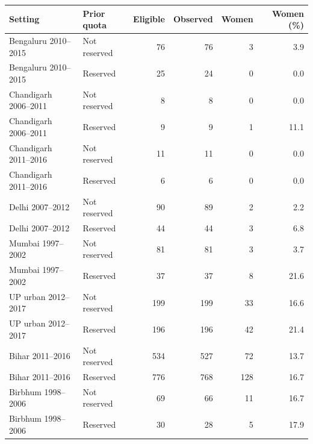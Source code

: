 \begin{tabular}{llrrrr}
\toprule
Setting & Prior quota & Eligible & Observed & Women & Women (\%) \\
\midrule
Bengaluru 2010--2015 & Not reserved & 76 & 76 & 3 & 3.9 \\
Bengaluru 2010--2015 & Reserved & 25 & 24 & 0 & 0.0 \\
Chandigarh 2006--2011 & Not reserved & 8 & 8 & 0 & 0.0 \\
Chandigarh 2006--2011 & Reserved & 9 & 9 & 1 & 11.1 \\
Chandigarh 2011--2016 & Not reserved & 11 & 11 & 0 & 0.0 \\
Chandigarh 2011--2016 & Reserved & 6 & 6 & 0 & 0.0 \\
Delhi 2007--2012 & Not reserved & 90 & 89 & 2 & 2.2 \\
Delhi 2007--2012 & Reserved & 44 & 44 & 3 & 6.8 \\
Mumbai 1997--2002 & Not reserved & 81 & 81 & 3 & 3.7 \\
Mumbai 1997--2002 & Reserved & 37 & 37 & 8 & 21.6 \\
UP urban 2012--2017 & Not reserved & 199 & 199 & 33 & 16.6 \\
UP urban 2012--2017 & Reserved & 196 & 196 & 42 & 21.4 \\
Bihar 2011--2016 & Not reserved & 534 & 527 & 72 & 13.7 \\
Bihar 2011--2016 & Reserved & 776 & 768 & 128 & 16.7 \\
Birbhum 1998--2006 & Not reserved & 69 & 66 & 11 & 16.7 \\
Birbhum 1998--2006 & Reserved & 30 & 28 & 5 & 17.9 \\
\bottomrule
\end{tabular}
